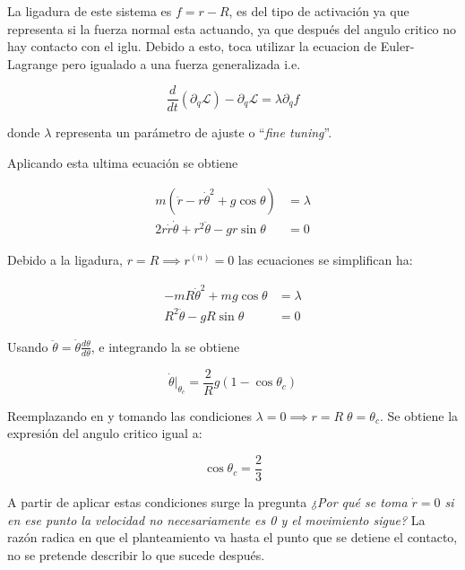 \documentclass{article}
\theoremstyle{definition}
\begin{document}
La ligadura de este sistema es $f = r - R$, es del tipo de activación ya que representa si la fuerza normal esta actuando, ya que después del angulo critico no hay contacto con el iglu. Debido a esto, toca utilizar la ecuacion de Euler-Lagrange pero igualado a una fuerza generalizada i.e.

\begin{equation}
	\frac{d}{dt}\left(\partial_{\dot{q}} \mathcal{L}\right) - \partial_q \mathcal{L} = \lambda \partial_{q}f
\end{equation}

donde $\lambda$ representa un parámetro de ajuste o ``\emph{fine tuning}''.

Aplicando esta ultima ecuación se obtiene

\begin{align}
	m \left(\ddot{r} - r \dot{\theta}^2 + g\cos{\theta}\right) &= \lambda \\
	2r\dot{r}\dot{\theta} + r^2\ddot{\theta} - gr\sin{\theta} &= 0
\end{align}

Debido a la ligadura, $r = R \implies r^{(n)} = 0$ las ecuaciones se simplifican ha:

\begin{align}
	-mR\dot{\theta}^{2} + mg\cos{\theta} &= \lambda \label{eq:r_equation}\\
	R^2 \ddot{\theta} - gR\sin{\theta} &= 0 \label{eq:critical_theta}
\end{align}

Usando $\ddot{\theta} = \dot{\theta}\frac{d \theta}{d\theta}$, e integrando la  se obtiene

\begin{equation}
	\dot{\theta} |_{\theta_c} = \frac{2}{R} g\left(1 - \cos{\theta_c} \right)
\end{equation}

Reemplazando en  y tomando las condiciones $\lambda = 0 \implies r = R \; \theta = \theta_c$. Se obtiene la expresión del angulo critico igual a:

\begin{equation}
	\cos{\theta_c} = \frac{2}{3}
\end{equation}

A partir de aplicar estas condiciones surge la pregunta \emph{¿Por qué se toma $\dot{r} = 0$ si en ese punto la velocidad no necesariamente es 0 y el movimiento sigue?} La razón radica en que el planteamiento va hasta el punto que se detiene el contacto, no se pretende describir lo que sucede después.
\end{document}
